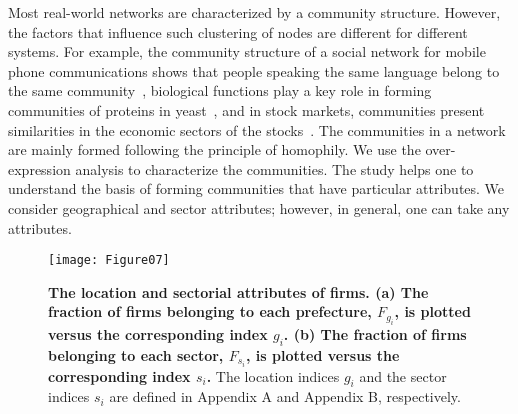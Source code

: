 \documentclass[pre,floatfix,twocolumn,showpacs,a4paper,nofootinbib]{revtex4}
\begin{document}
Most real-world networks are characterized by a community structure.  However, the factors that influence 
such clustering of nodes are different for different systems. For example,  the community
structure of a social network for mobile phone communications shows that people speaking the same 
language belong to the same community~\cite{blondel2008fast},  biological functions play a key role in forming 
communities of proteins in yeast~\cite{chen2006detecting}, and in stock markets, communities present similarities in the 
economic sectors of the stocks~\cite{onnela2003dynamics}. The communities in a network are mainly formed following
the principle of homophily. We use the over-expression analysis to characterize the communities. 
The study helps one to understand the basis of forming communities that have particular attributes.
We consider geographical and sector attributes; however, in general, one can take any attributes.  



\begin{figure}[t]
\begin{center}
\texttt{[image: Figure07]}
\end{center}
\caption{
{\bf The location and sectorial attributes of firms.
(a) The fraction of firms belonging to each prefecture, $F_{g_i}$, is plotted versus the corresponding index $g_i$.
(b) The fraction of firms belonging to each sector, $F_{s_i}$, is plotted versus the corresponding index $s_i$.}
The location indices $g_i$ and the sector indices $s_i$ are defined in Appendix A and Appendix B, respectively. 
}
\label{fig7}
\end{figure}
\end{document}
